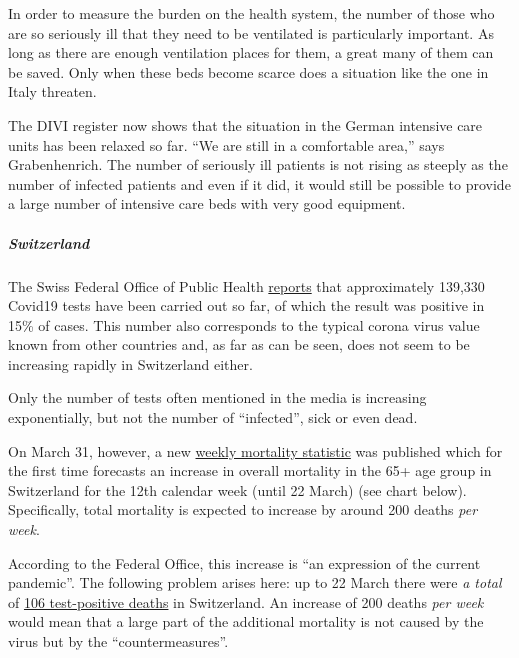In order to measure the burden on the health system, the number of those
who are so seriously ill that they need to be ventilated is particularly
important. As long as there are enough ventilation places for them, a
great many of them can be saved. Only when these beds become scarce does
a situation like the one in Italy threaten.

The DIVI register now shows that the situation in the German intensive
care units has been relaxed so far. ``We are still in a comfortable
area,'' says Grabenhenrich. The number of seriously ill patients is not
rising as steeply as the number of infected patients and even if it did,
it would still be possible to provide a large number of intensive care
beds with very good equipment.

\hypertarget{switzerland-2}{%
\subparagraph{\texorpdfstring{\textbf{Switzerland}}{Switzerland}}\label{switzerland-2}}

The Swiss Federal Office of Public Health
\href{https://www.bag.admin.ch/bag/de/home/krankheiten/ausbrueche-epidemien-pandemien/aktuelle-ausbrueche-epidemien/novel-cov/situation-schweiz-und-international.html}{reports}
that approximately 139,330 Covid19 tests have been carried out so far,
of which the result was positive in 15\% of cases. This number also
corresponds to the typical corona virus value known from other countries
and, as far as can be seen, does not seem to be increasing rapidly in
Switzerland either.

Only the number of tests often mentioned in the media is increasing
exponentially, but not the number of ``infected'', sick or even dead.

On March 31, however, a new
\href{https://www.bfs.admin.ch/bfs/de/home/statistiken/gesundheit/gesundheitszustand/sterblichkeit-todesursachen.html}{weekly
mortality statistic} was published which for the first time forecasts an
increase in overall mortality in the 65+ age group in Switzerland for
the 12th calendar week (until 22 March) (see chart below). Specifically,
total mortality is expected to increase by around 200 deaths \emph{per
week}.

According to the Federal Office, this increase is ``an expression of the
current pandemic''. The following problem arises here: up to 22 March
there were \emph{a total} of
\href{https://de.wikipedia.org/wiki/COVID-19-Pandemie_in_der_Schweiz\#Todesf\%C3\%A4lle}{106
test-positive deaths} in Switzerland. An increase of 200 deaths
\emph{per week} would mean that a large part of the additional mortality
is not caused by the virus but by the ``countermeasures''.

